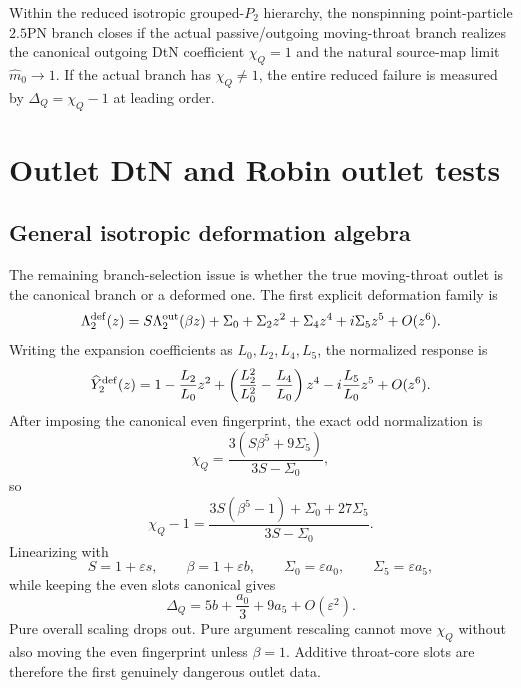 \begin{theorem}
\label{thm:part04-conditional-25pn-closure}
Within the reduced isotropic grouped-\(P_2\) hierarchy, the nonspinning point-particle \(2.5\)PN branch closes if the actual passive/outgoing moving-throat branch realizes the canonical outgoing DtN coefficient \(\chi_Q=1\) and the natural source-map limit \(\widehat m_0\to1\).  If the actual branch has \(\chi_Q\neq1\), the entire reduced failure is measured by \(\Delta_Q=\chi_Q-1\) at leading order.
\end{theorem}

\section{Outlet DtN and Robin outlet tests}
\label{sec:part04_geometry_retarded_mouth:outlet-dtn-and-robin-outlet-tests}

\subsection{General isotropic deformation algebra}
\label{subsec:part04-general-dtn-algebra}

The remaining branch-selection issue is whether the true moving-throat outlet is the canonical branch or a deformed one.  The first explicit deformation family is
\begin{equation}
\label{eq:part04-general-dtn-deformation}
\Lambda_2^{\rm def}(z)
=
S\Lambda_2^{\rm out}(\beta z)
+\Sigma_0+\Sigma_2z^2+\Sigma_4z^4+i\Sigma_5z^5+O(z^6).
\end{equation}
Writing the expansion coefficients as \(L_0,L_2,L_4,L_5\), the normalized response is
\begin{equation}
\label{eq:part04-Ydef-expanded}
\widehat Y_2^{\rm def}(z)
=
1-\frac{L_2}{L_0}z^2+
\left(\frac{L_2^2}{L_0^2}-\frac{L_4}{L_0}\right)z^4
-i\frac{L_5}{L_0}z^5+O(z^6).
\end{equation}
After imposing the canonical even fingerprint, the exact odd normalization is
\begin{equation}
\label{eq:part04-chiQ-general}
\chi_Q
=
\frac{3(S\beta^5+9\Sigma_5)}{3S-\Sigma_0},
\end{equation}
so
\begin{equation}
\label{eq:part04-chiQ-minus-one-general}
\chi_Q-1
=
\frac{3S(\beta^5-1)+\Sigma_0+27\Sigma_5}{3S-\Sigma_0}.
\end{equation}
Linearizing with
\begin{equation}
S=1+\varepsilon s,
\qquad
\beta=1+\varepsilon b,
\qquad
\Sigma_0=\varepsilon a_0,
\qquad
\Sigma_5=\varepsilon a_5,
\end{equation}
while keeping the even slots canonical gives
\begin{equation}
\label{eq:part04-linear-DeltaQ-triple}
\Delta_Q=5b+\frac{a_0}{3}+9a_5+O(\varepsilon^2).
\end{equation}
Pure overall scaling drops out.  Pure argument rescaling cannot move \(\chi_Q\) without also moving the even fingerprint unless \(\beta=1\).  Additive throat-core slots are therefore the first genuinely dangerous outlet data.

